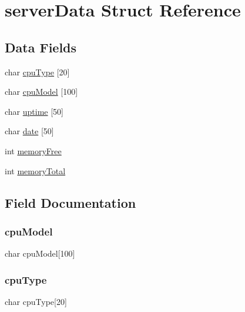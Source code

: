 \hypertarget{structserver_data}{}\section{server\+Data Struct Reference}
\label{structserver_data}
\subsection*{Data Fields}
\begin{DoxyCompactItemize}
\item 
char \hyperlink{structserver_data_a8f88ecb6bd38ff3fdea1a9270dad5c9b}{cpu\+Type} \mbox{[}20\mbox{]}
\item 
char \hyperlink{structserver_data_aa0dcd9b233a31d90de75e4072de95cca}{cpu\+Model} \mbox{[}100\mbox{]}
\item 
char \hyperlink{structserver_data_a26d9bdc16e7cacee5aa7c9de240f6abc}{uptime} \mbox{[}50\mbox{]}
\item 
char \hyperlink{structserver_data_a4373f53bb18f843a0ddece9a1013449d}{date} \mbox{[}50\mbox{]}
\item 
int \hyperlink{structserver_data_ad1bba3e10658f8e7b0b7051c554b4f53}{memory\+Free}
\item 
int \hyperlink{structserver_data_ac1442751817edc8e5bee4195eb081a54}{memory\+Total}
\end{DoxyCompactItemize}


\subsection{Field Documentation}
\mbox{\label{structserver_data_aa0dcd9b233a31d90de75e4072de95cca}} 
\subsubsection{\texorpdfstring{cpu\+Model}{cpuModel}}
{\footnotesize\ttfamily char cpu\+Model\mbox{[}100\mbox{]}}

\mbox{\label{structserver_data_a8f88ecb6bd38ff3fdea1a9270dad5c9b}} 
\subsubsection{\texorpdfstring{cpu\+Type}{cpuType}}
{\footnotesize\ttfamily char cpu\+Type\mbox{[}20\mbox{]}}

